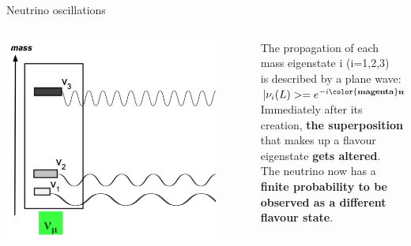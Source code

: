 \begin{frame}{Neutrino oscillations}

\begin{columns}
 \begin{column}{0.60\textwidth}
   \begin{center}
   \includegraphics[width=0.88\textwidth]{./images/osc101/numu_propagation_01}\\
   \end{center}
 \end{column}
 \begin{column}{0.40\textwidth}
  The propagation of each mass eigenstate i (i=1,2,3)\\ is described by a plane wave:\\
     \hspace{0.3cm} $|\nu_{i}(L)>=e^{-i {\bf
         \color{magenta}m_{i}^{2}}L/2E}{\cdot}|\nu_{i}(0)>$\\
  \vspace{0.4cm}
  Immediately after its creation, {\bf the superposition} that makes up a
  flavour eigenstate {\bf gets altered}.\\
  \vspace{0.2cm}
  The neutrino now has a {\bf finite probability to be observed as a
  different flavour state}.
 \end{column}
\end{columns}

\end{frame}

